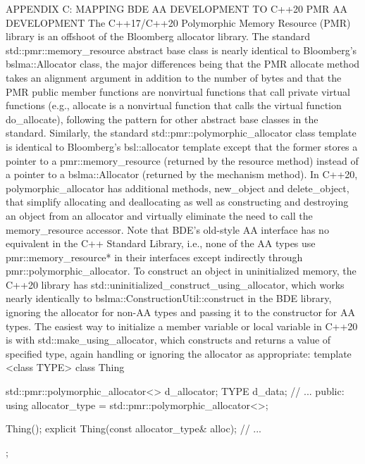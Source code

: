 {{{{{{{{APPENDIX C: MAPPING BDE AA DEVELOPMENT TO 
C++20 PMR AA DEVELOPMENT
The C++17/C++20 Polymorphic Memory Resource (PMR) library is an offshoot of the Bloomberg allocator library. The standard std::pmr::memory_resource abstract base class is nearly identical to Bloomberg’s bslma::Allocator class, the major differences being that the PMR allocate method takes an alignment argument in addition to the number of bytes and that the PMR public member functions are nonvirtual functions that call private virtual functions (e.g., allocate is a nonvirtual function that calls the virtual function do_allocate), following the pattern for other abstract base classes in the standard. Similarly, the standard std::pmr::polymorphic_allocator class template is identical to Bloomberg’s bsl::allocator template except that the former stores a pointer to a pmr::memory_resource (returned by the resource method) instead of a pointer to a bslma::Allocator (returned by the mechanism method). In C++20, polymorphic_allocator has additional methods, new_object and delete_object, that simplify allocating and deallocating as well as constructing and destroying an object from an allocator and virtually eliminate the need to call the memory_resource accessor.  Note that BDE’s old-style AA interface has no equivalent in the C++ Standard Library, i.e., none of the AA types use pmr::memory_resource* in their interfaces except indirectly through pmr::polymorphic_allocator.
To construct an object in uninitialized memory, the C++20 library has std::uninitialized_construct_using_allocator, which works nearly identically to bslma::ConstructionUtil::construct in the BDE library, ignoring the allocator for non-AA types and passing it to the constructor for AA types. The easiest way to initialize a member variable or local variable in C++20 is with std::make_using_allocator, which constructs and returns a value of specified type, again handling or ignoring the allocator as appropriate:
template <class TYPE>
class Thing {
    std::pmr::polymorphic_allocator<> d_allocator;
    TYPE                              d_data;
    // ...
  public:
    using allocator_type = std::pmr::polymorphic_allocator<>;

    Thing();
    explicit Thing(const allocator_type& alloc);
    // ...
};

}}}}}}}}
